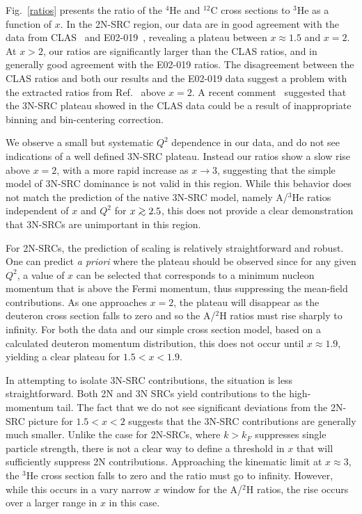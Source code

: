 Fig.~\ref{ratios} presents the ratio of the $^4$He and $^{12}$C cross sections to $^3$He as a function of $x$. In the 2N-SRC region, our data
are in good agreement with the data from CLAS~\cite{PhysRevLett.96.082501} and E02-019~\cite{fomin2012}, revealing a plateau between $x \approx
1.5$ and $x = 2$. At $x>2$, our ratios are significantly larger than the CLAS ratios, and in generally good agreement with the E02-019 ratios.
The disagreement between the CLAS ratios and both our results and the E02-019 data suggest a problem with the extracted ratios from
Ref.~\cite{PhysRevLett.96.082501} above $x=2$. A recent comment~\cite{Higinbotham:2014xna} suggested that the 3N-SRC plateau showed in the CLAS
data could be a result of inappropriate binning and bin-centering correction.

We observe a small but systematic $Q^2$ dependence in our data, and do not see indications of a well defined 3N-SRC plateau. Instead our ratios
show a slow rise above $x=2$, with a more rapid increase as $x \to 3$, suggesting that the simple model of 3N-SRC dominance is not valid in this
region. While this behavior does not match the prediction of the native 3N-SRC model, namely A/$^3$He ratios independent of $x$ and $Q^2$ for $x
\gtorder 2.5$, this does not provide a clear demonstration that 3N-SRCs are unimportant in this region.

For 2N-SRCs, the prediction of scaling is relatively straightforward and robust. One can predict \textit{a priori} where the plateau should be
observed since for any given $Q^2$, a value of $x$ can be selected that corresponds to a minimum nucleon momentum that is above the Fermi
momentum, thus suppressing the mean-field contributions. As one approaches $x=2$, the plateau will disappear as the deuteron cross section falls
to zero and so the A/$^2$H ratios must rise sharply to infinity. For both the data and our simple cross section model, based on a calculated
deuteron momentum distribution, this does not occur until $x \approx 1.9$, yielding a clear plateau for $1.5 < x < 1.9$.

In attempting to isolate 3N-SRC contributions, the situation is less straightforward. Both 2N and 3N SRCs yield contributions to the 
high-momentum tail. The fact that we do not see significant deviations from the 2N-SRC picture for $1.5<x<2$ suggests that the 3N-SRC
contributions are generally much smaller. Unlike the case for 2N-SRCs, where $k>k_F$ suppresses single particle strength, there is
not a clear way to define a threshold in $x$ that will sufficiently suppress
2N contributions.  Approaching the kinematic limit at $x \approx 3$, the $^3$He cross section falls to zero and the ratio must go to
infinity. However, while this occurs in a vary narrow $x$ window for the A/$^2$H ratios, the rise occurs over a larger range in $x$
in this case.

